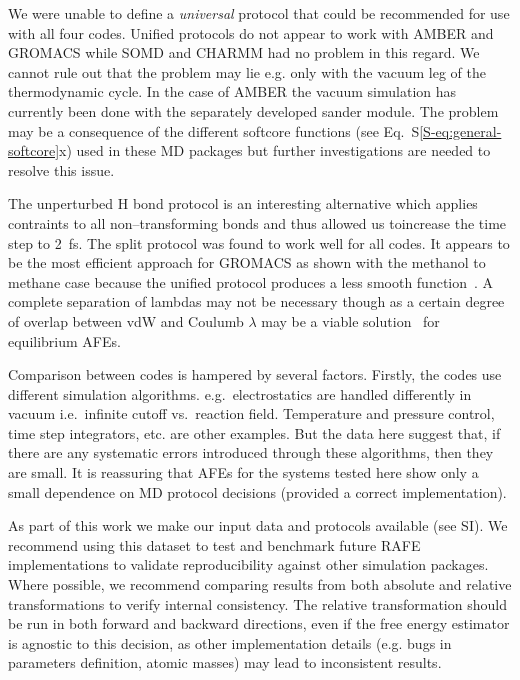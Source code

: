 \documentclass[journal=jctcce,manuscript=article]{achemso}
\begin{document}
We were unable to define  a \emph{universal} protocol that could be recommended for use with all four codes.  Unified protocols do not appear to work with AMBER and GROMACS while SOMD and CHARMM had no problem in this regard.  We cannot rule out that the problem may lie e.g. only with the 
vacuum leg of the thermodynamic cycle.  In the case of AMBER the vacuum simulation has currently been done with the separately developed sander module.  The problem may be a consequence of the different softcore functions (see Eq.~S\ref{S-eq:general-softcore}x) used in these MD packages but further investigations are needed to resolve this issue. 

The unperturbed H bond protocol is an interesting alternative which 
applies contraints to all non--transforming bonds and thus allowed us toincrease the time step to \SI{2}{fs}. 
 The split protocol was found to work  well for all codes.
  It appears to be the most efficient 
approach for GROMACS as shown with the methanol to methane case because the unified protocol produces a less smooth function~\cite{shirts_chapter_2007}.
A complete separation of lambdas may not be necessary though as a certain degree of overlap between vdW and Coulumb $\lambda$ may be a viable 
solution~\cite{procacci_fast_2014} for equilibrium AFEs. %

Comparison between codes is hampered by several factors.  Firstly, the codes use different simulation algorithms.  e.g.\ 
electrostatics are handled differently in vacuum i.e.\ infinite cutoff vs.\ 
reaction field.  Temperature and pressure control, time step integrators, etc. are other examples.  But the data here suggest that, if there are any systematic errors introduced through these algorithms, then they are small.  It is reassuring that AFEs for the systems tested here show only a small dependence on MD protocol decisions (provided a correct implementation).

As part of this work we make our input data and protocols available (see SI).  We recommend using this dataset to test and benchmark future RAFE implementations to validate reproducibility against other simulation packages.
Where possible, we recommend comparing results from both absolute and relative transformations to verify internal consistency.
The relative transformation should be run in both forward and backward directions, even if the free energy estimator is agnostic to this decision, as other implementation details (e.g. bugs in parameters definition, atomic masses) may lead to inconsistent results.  
\end{document}
